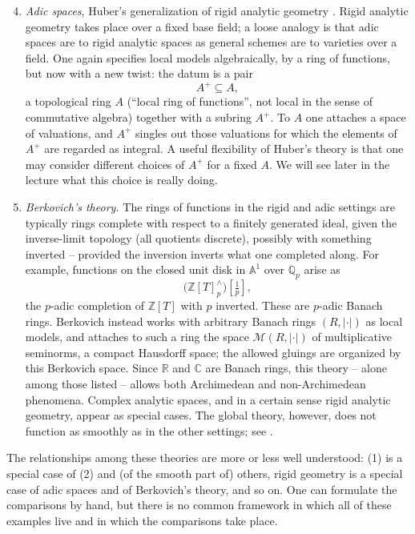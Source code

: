 \begin{enumerate}
\setcounter{enumi}{3}
\item \emph{Adic spaces}, Huber's generalization of rigid analytic geometry
\cite{Huber_1994}. Rigid analytic geometry takes place over a fixed base field;
a loose analogy is that adic spaces are to rigid analytic spaces as general
schemes are to varieties over a field. One again specifies local models
algebraically, by a ring of functions, but now with a new twist: the datum is a
pair
\[
A^{+}\subseteq A,
\]
a topological ring $A$ (``local ring of functions'', not local in the sense of
commutative algebra) together with a subring $A^{+}$. To $A$ one attaches a
space of valuations, and $A^{+}$ singles out those valuations for which the
elements of $A^{+}$ are regarded as integral. A useful flexibility of Huber's
theory is that one may consider different choices of $A^{+}$ for a fixed $A$. We
will see later in the lecture what this choice is really doing.

\item \emph{Berkovich's theory.} The rings of functions in the rigid and adic
settings are typically rings complete with respect to a finitely generated
ideal, given the inverse-limit topology (all quotients discrete), possibly with
something inverted -- provided the inversion inverts what one completed along.
For example, functions on the closed unit disk in $\mathbb{A}^1$ over
$\mathbb{Q}_p$ arise as
\[
\bigl(\mathbb{Z}[T]^{\wedge}_{p}\bigr)\!\left[\tfrac{1}{p}\right],
\]
the $p$-adic completion of $\mathbb{Z}[T]$ with $p$ inverted. These are $p$-adic
Banach rings. Berkovich instead works with arbitrary Banach rings
$(R,\lvert\cdot\rvert)$ as local models, and attaches to such a ring the space
$\mathcal{M}(R,\lvert\cdot\rvert)$ of multiplicative seminorms, a compact
Hausdorff space; the allowed gluings are organized by this Berkovich space. Since
$\mathbb{R}$ and $\mathbb{C}$ are Banach rings, this theory -- alone among those
listed -- allows both Archimedean and non-Archimedean phenomena. Complex
analytic spaces, and in a certain sense rigid analytic geometry, appear as
special cases. The global theory, however, does not function as smoothly as in
the other settings; see \cite{Berkovich_2012}.
\end{enumerate}

The relationships among these theories are more or less well understood: (1) is a
special case of (2) and (of the smooth part of) others, rigid geometry is a
special case of adic spaces and of Berkovich's theory, and so on. One can
formulate the comparisons by hand, but there is no common framework in which all
of these examples live and in which the comparisons take place.

